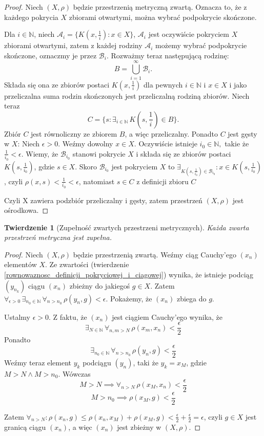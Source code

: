 \documentclass[licencjacka]{pwr_wmat_praca_dyplomowa}
\theoremstyle{plain}
\newtheorem{theorem}{Twierdzenie}
\numberwithin{theorem}{chapter}
\theoremstyle{definition}
\numberwithin{theorem}{chapter}
\begin{document}
\begin{proof}
Niech $(X, \rho)$ będzie przestrzenią metryczną zwartą. Oznacza to, że z każdego pokrycia $X$ zbiorami otwartymi, można wybrać podpokrycie skończone.

Dla $i \in \mathbb{N}$, niech $\mathcal{A}_{i} = \{ K(x, \frac{1}{i}) : x \in X \}$, $\mathcal{A}_{i}$ jest oczywiście pokryciem $X$ zbiorami otwartymi, zatem z każdej rodziny $\mathcal{A}_{i}$ możemy wybrać podpokrycie skończone, oznaczmy je przez $\mathcal{B}_{i}$. Rozważmy teraz następującą rodzinę: 
$$B = \bigcup\limits_{i=1}^{\infty} \mathcal{B}_{i}.$$
Składa się ona ze zbiorów postaci $K(x, \frac{1}{i})$ dla pewnych $i \in \mathbb{N}$ i $x \in X$ i jako przeliczalna suma rodzin skończonych jest przeliczalną rodziną zbiorów.
Niech teraz 
$$C = \{ s : \exists_{i \in \mathbb{N}} \, K\left(s, \frac{1}{i}\right) \in B \}.$$
Zbiór $C$ jest równoliczny ze zbiorem $B$, a więc przeliczalny.
Ponadto $C$ jest gęsty w $X$:
Niech $\epsilon > 0$. Weźmy dowolny $x \in X$. Oczywiście istnieje $i_0 \in \mathbb{N},$ takie że $\frac{1}{i_0} < \epsilon$. Wiemy, że $\mathcal{B}_{i_0}$ stanowi pokrycie $X$ i składa się ze zbiorów postaci $K(s, \frac{1}{i_0})$, gdzie $s \in X$. Skoro $\mathcal{B}_{i_0}$ jest pokryciem $X$ to $\exists_{K(s, \frac{1}{i_0}) \in \mathcal{B}_{i_0}} : x \in K(s, \frac{1}{i_0})$, czyli $\rho(x, s) < \frac{1}{i_0} < \epsilon$, natomiast $s \in C$ z definicji zbioru $C$

Czyli X zawiera podzbiór przeliczalny i gęsty, zatem przestrzeń $(X, \rho)$ jest ośrodkowa.
\end{proof}


\begin{theorem}[Zupełność zwartych przestrzeni metrycznych] \label{zwarta_jest_zupelna}
Każda zwarta przestrzeń metryczna jest zupełna.
\end{theorem}

\begin{proof}
Niech $(X, \rho)$  będzie przestrzenią zwartą.
Weźmy ciąg Cauchy'ego $(x_n)$ elementów $X$. Ze zwartości (twierdzenie \ref{rownowaznosc_definicji_pokryciowej_i_ciagowej}) wynika, że istnieje podciąg $(y_{n_k})$ ciągu $(x_n)$ zbieżny do jakiegoś $g \in X$. Zatem $\forall_{\epsilon > 0} \, \exists_{n_0 \in \mathbb{N}} \, \forall_{n > n_0} \, \rho(y_n, g) < \epsilon$.
Pokażemy, że $(x_n)$ zbiega do $g$.

Ustalmy $\epsilon > 0$. Z faktu, że $(x_n)$ jest ciągiem Cauchy'ego wynika, że $$\exists_{N \in \mathbb{N}} \, \forall_{n, m > N} \, \rho(x_m, x_n) < \frac{\epsilon}{2}$$ Ponadto $$\exists_{n_0 \in \mathbb{N}} \, \forall_{n > n_0} \, \rho(y_n, g) < \frac{\epsilon}{2}$$ Weźmy teraz element $y_{k}$ podciągu $(y_n)$, taki że $y_{k} = x_M$, gdzie $M > N \land M > n_0$. Wówczas 
$$M > N \implies \forall_{n > N} \, \rho(x_M, x_n) < \frac{\epsilon}{2}$$
$$M > n_0 \implies \rho(x_M, g) < \frac{\epsilon}{2}$$

Zatem $\forall_{n > N}: \rho(x_n, g) \leq \rho(x_n, x_M) + \rho(x_M, g) < \frac{\epsilon}{2} + \frac{\epsilon}{2} = \epsilon$, czyli $g \in X$ jest granicą ciągu $(x_n)$, a więc $(x_n)$ jest zbieżny w $(X, \rho)$.
\end{proof}
\end{document}
